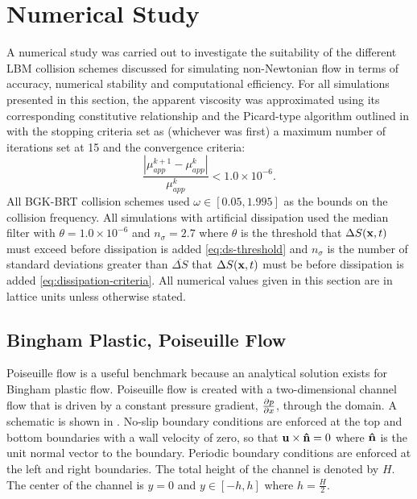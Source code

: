 \section{Numerical Study} \label{sec:numerical-study}

A numerical study was carried out to investigate the suitability of the different LBM collision schemes discussed for simulating non-Newtonian flow in terms of accuracy, numerical stability and computational efficiency.
For all simulations presented in this section, the apparent viscosity was approximated using its corresponding constitutive relationship and the Picard-type algorithm outlined in  with the stopping criteria set as (whichever was first) a maximum number of iterations set at 15 and the convergence criteria:
\begin{equation} \label{eq:mu-app-conv}
\frac{\left|\mu_{app}^{k+1} - \mu_{app}^{k}\right|}{\mu_{app}^{k}} < 1.0 \times 10^{-6}.
\end{equation}
All BGK-BRT collision schemes used $\omega \in [0.05, 1.995]$ as the bounds on the collision frequency.
All simulations with artificial dissipation used the median filter with $\theta = 1.0 \times 10^{-6}$ and $n_{\sigma} = 2.7$ where $\theta$ is the threshold that $\Delta S(\mathbf{x}, t)$ must exceed before dissipation is added \eqref{eq:ds-threshold} and $n_{\sigma}$ is the number of standard deviations greater than $\overline{\Delta S}$ that $\Delta S(\mathbf{x}, t)$ must be before dissipation is added \eqref{eq:dissipation-criteria}.
All numerical values given in this section are in lattice units unless otherwise stated.

\subsection{Bingham Plastic, Poiseuille Flow} \label{sec:poise-bing}

Poiseuille flow is a useful benchmark because an analytical solution exists for Bingham plastic flow.
Poiseuille flow is created with a two-dimensional channel flow that is driven by a constant pressure gradient, $\frac{\partial p}{\partial x}$, through the domain.
A schematic is shown in .
No-slip boundary conditions are enforced at the top and bottom boundaries with a wall velocity of zero, so that $\mathbf{u} \times \mathbf{\hat{n}} = 0$ where $\mathbf{\hat{n}}$ is the unit normal vector to the boundary. 
Periodic boundary conditions are enforced at the left and right boundaries.
The total height of the channel is denoted by $H$.
The center of the channel is $y = 0$ and $y \in [-h, h]$ where $h = \frac{H}{2}$.

